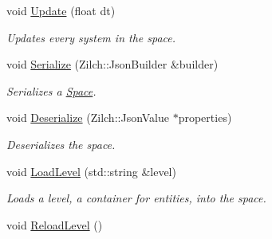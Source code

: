 \begin{DoxyCompactItemize}
\item 
\hypertarget{classDCEngine_1_1Space_aa89094484fab236624982dcc6f911b1e}{void \hyperlink{classDCEngine_1_1Space_aa89094484fab236624982dcc6f911b1e}{Update} (float dt)}\label{classDCEngine_1_1Space_aa89094484fab236624982dcc6f911b1e}

\begin{DoxyCompactList}\small\item\em Updates every system in the space. \end{DoxyCompactList}\item 
void \hyperlink{classDCEngine_1_1Space_a956b2a069ca52797a8456d5fac944ead}{Serialize} (Zilch\-::\-Json\-Builder \&builder)
\begin{DoxyCompactList}\small\item\em Serializes a \hyperlink{classDCEngine_1_1Space}{Space}. \end{DoxyCompactList}\item 
void \hyperlink{classDCEngine_1_1Space_af8614fd0112923db3412959e430f57c2}{Deserialize} (Zilch\-::\-Json\-Value $\ast$properties)
\begin{DoxyCompactList}\small\item\em Deserializes the space. \end{DoxyCompactList}\item 
void \hyperlink{classDCEngine_1_1Space_a2a04964a03c83b13541488d4017c46dd}{Load\-Level} (std\-::string \&level)
\begin{DoxyCompactList}\small\item\em Loads a level, a container for entities, into the space. \end{DoxyCompactList}\item 
\hypertarget{classDCEngine_1_1Space_a8c55b841a6535e05d0a230ba102d991a}{void \hyperlink{classDCEngine_1_1Space_a8c55b841a6535e05d0a230ba102d991a}{Reload\-Level} ()}\label{classDCEngine_1_1Space_a8c55b841a6535e05d0a230ba102d991a}


\end{DoxyCompactItemize}
